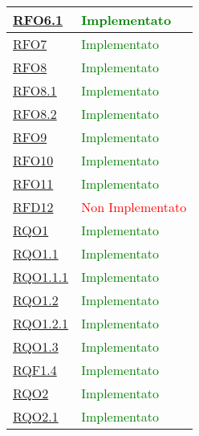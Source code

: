 \begin{longtable}{|>{\centering}m{5cm}|m{5cm}<{\centering}|}
\hyperlink{RFO6.1}{RFO6.1} & \textcolor{green}{Implementato}\\ \hline

\hyperlink{RFO7}{RFO7} &  \textcolor{green}{Implementato}\\ \hline

\hyperlink{RFO8}{RFO8} &  \textcolor{green}{Implementato}\\ \hline

\hyperlink{RFO8.1}{RFO8.1} &  \textcolor{green}{Implementato}\\ \hline

\hyperlink{RFO8.2}{RFO8.2} & \textcolor{green}{Implementato}\\ \hline

\hyperlink{RFO9}{RFO9} & \textcolor{green}{Implementato}\\ \hline
	
\hyperlink{RFO10}{RFO10} &  \textcolor{green}{Implementato}\\ \hline

\hyperlink{RFO11}{RFO11} &  \textcolor{green}{Implementato}\\ \hline

\hyperlink{RFD12}{RFD12} &  \textcolor{red}{Non Implementato}\\ \hline

\hyperlink{RQO1}{RQO1} & \textcolor{green}{Implementato}\\ \hline

\hyperlink{RQO1.1}{RQO1.1} &  \textcolor{green}{Implementato}\\ \hline

\hyperlink{RQO1.1.1}{RQO1.1.1} &  \textcolor{green}{Implementato}\\ \hline

\hyperlink{RQO1.2}{RQO1.2} & \textcolor{green}{Implementato}\\ \hline

\hyperlink{RQO1.2.1}{RQO1.2.1} & \textcolor{green}{Implementato}\\ \hline

\hyperlink{RQO1.3}{RQO1.3} &  \textcolor{green}{Implementato}\\ \hline

\hyperlink{RQF1.4}{RQF1.4} & \textcolor{green}{Implementato}\\ \hline

\hyperlink{RQO2}{RQO2} & \textcolor{green}{Implementato}\\ \hline

\hyperlink{RQO2.1}{RQO2.1} & \textcolor{green}{Implementato}\\ \hline


\end{longtable}
